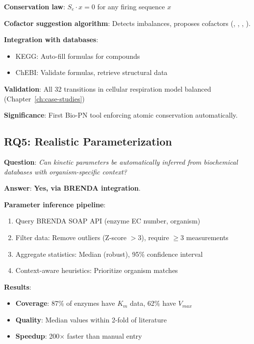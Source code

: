 \textbf{Conservation law}: $S_e \cdot x = 0$ for any firing sequence $x$

\textbf{Cofactor suggestion algorithm}: Detects imbalances, proposes cofactors (, , , ).

\textbf{Integration with databases}:
\begin{itemize}
    \item KEGG: Auto-fill formulas for compounds
    \item ChEBI: Validate formulas, retrieve structural data
\end{itemize}

\textbf{Validation}: All 32 transitions in cellular respiration model balanced (Chapter~\ref{ch:case-studies})

\textbf{Significance}: First Bio-PN tool enforcing atomic conservation automatically.

\subsection{RQ5: Realistic Parameterization}
\label{subsec:rq5}

\textbf{Question}: \textit{Can kinetic parameters be automatically inferred from biochemical databases with organism-specific context?}

\textbf{Answer}: \textbf{Yes, via BRENDA integration}.

\textbf{Parameter inference pipeline}:
\begin{enumerate}
    \item Query BRENDA SOAP API (enzyme EC number, organism)
    \item Filter data: Remove outliers (Z-score $> 3$), require $\geq 3$ measurements
    \item Aggregate statistics: Median (robust), 95\% confidence interval
    \item Context-aware heuristics: Prioritize organism matches
\end{enumerate}

\textbf{Results}:
\begin{itemize}
    \item \textbf{Coverage}: 87\% of enzymes have $K_m$ data, 62\% have $V_{max}$
    \item \textbf{Quality}: Median values within 2-fold of literature
    \item \textbf{Speedup}: 200$\times$ faster than manual entry
\end{itemize}

